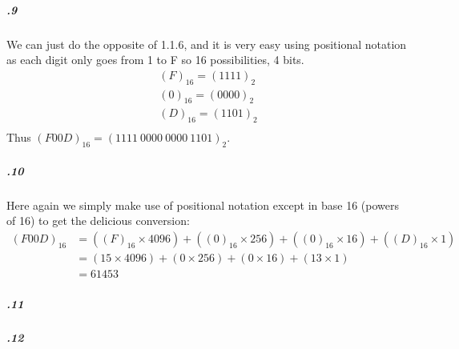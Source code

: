 \documentclass[11pt,letterpaper]{article}
\begin{document}
		\subparagraph{.9}
		We can just do the opposite of 1.1.6, and it is very easy using positional notation as each digit only goes from 1 to F so 16 possibilities, 4 bits.
		\begin{align*}
		(F)_{16} = (1111)_2\\
		(0)_{16} = (0000)_2\\
		(D)_{16} = (1101)_2\\
		\end{align*}
		Thus $(F00D)_{16} = (1111\ 0000\ 0000\ 1101)_2$.
		
		\subparagraph{.10}
		Here again we simply make use of positional notation except in base 16 (powers of 16) to get the delicious conversion:
		\begin{align*}
		(F00D)_16 &= ((F)_{16} \times 4096) + ((0)_{16} \times 256) + ((0)_{16} \times 16) + ((D)_{16} \times 1)\\
		&= (15 \times 4096) + (0 \times 256) + (0 \times 16) + (13 \times 1)\\
		&= 61 453
		\end{align*}
		
		\subparagraph{.11}
		
		\subparagraph{.12}
		
	\section{}
	
\end{document}
